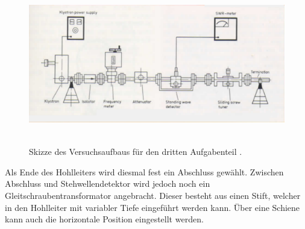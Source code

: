 \begin{figure}
  \centering
  \includegraphics[height=7cm]{ressources/aufbau3.png}
  \caption{Skizze des Versuchsaufbaus für den dritten Aufgabenteil \cite{skript}.}
  \label{fig:aufbau3}
\end{figure}

Als Ende des Hohlleiters wird diesmal fest ein Abschluss gewählt.
Zwischen Abschluss und Stehwellendetektor wird jedoch noch ein Gleitschraubentransformator angebracht.
Dieser besteht aus einen Stift, welcher in den Hohlleiter mit variabler Tiefe eingeführt werden kann.
Über eine Schiene kann auch die horizontale Position eingestellt werden.
